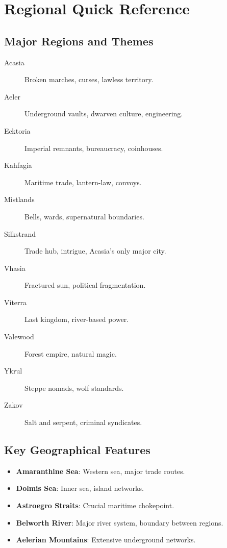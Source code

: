\newpage
\section{Regional Quick Reference}\label{sec:regional_reference}

\subsection{Major Regions and Themes}\label{subsec:regions_themes}
\begin{description}
    \item[Acasia] Broken marches, curses, lawless territory.
    \item[Aeler] Underground vaults, dwarven culture, engineering.
    \item[Ecktoria] Imperial remnants, bureaucracy, coinhouses.
    \item[Kahfagia] Maritime trade, lantern-law, convoys.
    \item[Mistlands] Bells, wards, supernatural boundaries.
    \item[Silkstrand] Trade hub, intrigue, Acasia's only major city.
    \item[Vhasia] Fractured sun, political fragmentation.
    \item[Viterra] Last kingdom, river-based power.
    \item[Valewood] Forest empire, natural magic.
    \item[Ykrul] Steppe nomads, wolf standards.
    \item[Zakov] Salt and serpent, criminal syndicates.
\end{description}

\subsection{Key Geographical Features}\label{subsec:geography_ref}
\begin{itemize}
    \item \textbf{Amaranthine Sea}: Western sea, major trade routes.
    \item \textbf{Dolmis Sea}: Inner sea, island networks.
    \item \textbf{Astroegro Straits}: Crucial maritime chokepoint.
    \item \textbf{Belworth River}: Major river system, boundary between regions.
    \item \textbf{Aelerian Mountains}: Extensive underground networks.
\end{itemize}

